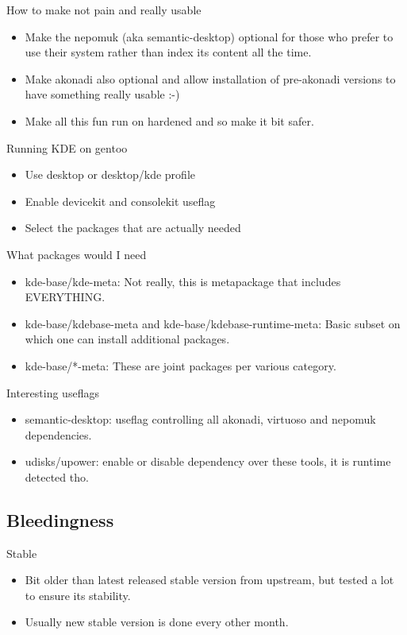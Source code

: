 \documentclass{beamer}
\begin{document}
\begin{frame}{How to make not pain and really usable}
	\begin{itemize}
		\item Make the nepomuk (aka semantic-desktop) optional for those who prefer to use their system rather than index its content all the time.
		\item Make akonadi also optional and allow installation of pre-akonadi versions to have something really usable :-)
		\item Make all this fun run on hardened and so make it bit safer.
	\end{itemize}
\end{frame}

\begin{frame}{Running KDE on gentoo}
	\begin{itemize}
		\item Use desktop or desktop/kde profile
		\item Enable devicekit and consolekit useflag
		\item Select the packages that are actually needed
	\end{itemize}
\end{frame}

\begin{frame}{What packages would I need}
	\begin{itemize}
		\item kde-base/kde-meta: Not really, this is metapackage that includes EVERYTHING.
		\item kde-base/kdebase-meta and kde-base/kdebase-runtime-meta: Basic subset on which one can install additional packages.
		\item kde-base/*-meta: These are joint packages per various category.
	\end{itemize}
\end{frame}

\begin{frame}{Interesting useflags}
	\begin{itemize}
		\item semantic-desktop: useflag controlling all akonadi, virtuoso and nepomuk dependencies.
		\item udisks/upower: enable or disable dependency over these tools, it is runtime detected tho.
	\end{itemize}
\end{frame}

\subsection{Bleedingness}
\begin{frame}{Stable}
	\begin{itemize}
		\item Bit older than latest released stable version from upstream, but tested a lot to ensure its stability.
		\item Usually new stable version is done every other month.
	\end{itemize}
\end{frame}
\end{document}
